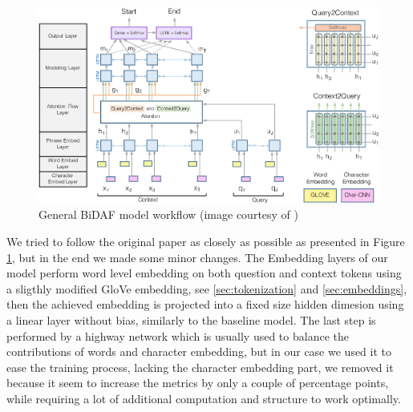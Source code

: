 \documentclass[a4paper,10pt]{report}
\begin{document}
\begin{figure}[!ht]
  \center
  \includegraphics[width=\linewidth]{bidaf}
  \caption{General BiDAF model workflow (image courtesy of \cite{bidaf-img})}
  \label{fig:bidaf}
\end{figure}

We tried to follow the original paper \cite{bidaf} as closely as possible as presented in Figure \ref{fig:bidaf}, but in the end we made some minor changes.
The Embedding layers of our model perform word level embedding on both question and context tokens using a sligthly modified GloVe embedding, see \ref{sec:tokenization} and \ref{sec:embeddings}, then the achieved embedding is projected into a fixed size hidden dimesion using a linear layer without bias, similarly to the baseline model. The last step is performed by a highway network \cite{highway-network} which is usually used to balance the contributions of words and character embedding, but in our case we used it to ease the training process, lacking the character embedding part, we removed it because it seem to increase the metrics by only a couple of percentage points, while requiring a lot of additional computation and structure to work optimally.
\end{document}

